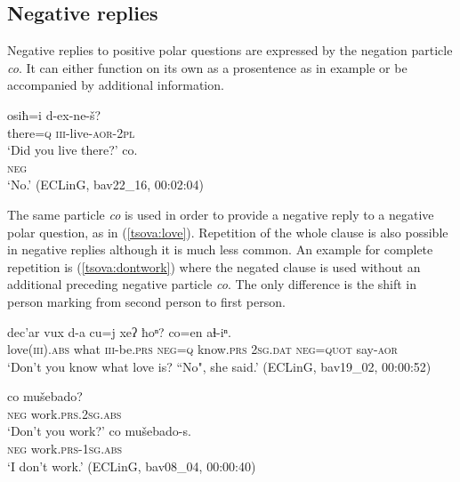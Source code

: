 \documentclass[output=paper,%
colorlinks,citecolor=brown,
showindex
]{langscibook}
\begin{document}
\subsection{Negative replies}
\label{tsova:reply}

Negative replies to positive polar questions are expressed by the negation particle \textit{co}. It can either function on its own as a prosentence as in example  or be accompanied by additional information. 

\ea	\label{tsova:no}
    \begin{xlist}[B: ]
        \gll osiħ=i d-ex-ne-š? \\  
        	there=\textsc{q} \textsc{iii}-live-\textsc{aor}-\textsc{2pl} \\
        \glt `Did you live there?' 
        \gll co.\\  
        	\textsc{neg}\\
        \glt `No.' (ECLinG, bav22\_16, 00:02:04) 
    \end{xlist}
\z 

The same particle \textit{co}  is used in order to provide a negative reply to a negative polar question, as in (\ref{tsova:love}). Repetition of the whole clause is also possible in negative replies although it is much less common. An example for complete repetition is  (\ref{tsova:dontwork}) where the negated clause is used without an additional preceding negative particle \textit{co}. The only difference is the shift in person marking from second person to first person.

\ea	\label{tsova:love}
\gll 	dec’ar	vux	d-a	cu=j	xeʔ	ħoⁿ?	co=en	aɬ-iⁿ.\\  
	love(\textsc{iii}).\textsc{abs} what \textsc{iii}-be.\textsc{prs} \textsc{neg=q} know.\textsc{prs} \textsc{2sg.dat} \textsc{neg=quot} say-\textsc{aor}\\ 
\glt `Don't you know what love is? “No", she said.' (ECLinG, bav19\_02, 00:00:52)
\z

\ea	\label{tsova:dontwork}
    \begin{xlist}[Q: ]
        \gll 	co	mušebado? \\  
        	\textsc{neg} work.\textsc{prs.2sg.abs} \\	
        \glt `Don’t you work?'
        \gll co	mušebado-s.\\  
        	\textsc{neg} work.\textsc{prs-1sg.abs}\\	
        \glt `I don’t work.' (ECLinG, bav08\_04, 00:00:40)
    \end{xlist}
\z 
\end{document}

